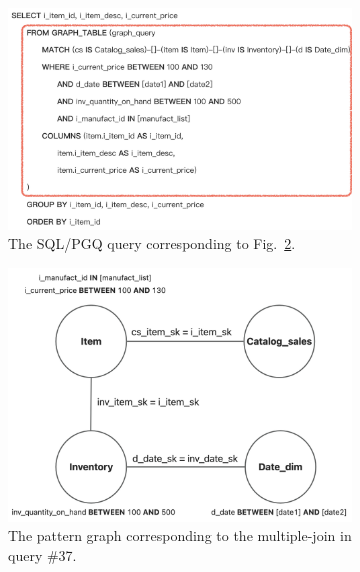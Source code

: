 \documentclass[sigconf, nonacm]{acmart}
\begin{document}
\begin{figure}
    \centering
    \begin{subfigure}[b]{0.4\linewidth}
        \centering
        \includegraphics[width=\linewidth]{./figures/intro-select-convert.png}
        \caption{The SQL/PGQ query corresponding to Fig.~\ref{fig:intro-graph-query}.}
        \label{fig:intro-select-convert}
    \end{subfigure}
    \begin{subfigure}[b]{0.3\linewidth}
        \centering
        \includegraphics[width=\linewidth]{./figures/intro-graph-query.png}
        \caption{The pattern graph corresponding to the multiple-join in query \#37.}
        \label{fig:intro-graph-query}
    \end{subfigure}
    \begin{subfigure}[b]{0.25\linewidth}

\end{subfigure}
\end{figure}
\end{document}
